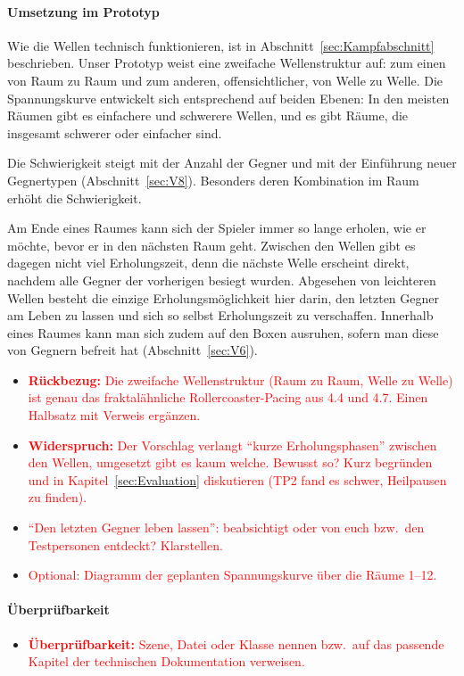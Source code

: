 \documentclass[../Main.tex]{subfiles}
\begin{document}
\paragraph{Umsetzung im Prototyp}
Wie die Wellen technisch funktionieren, ist in Abschnitt~\ref{sec:Kampfabschnitt} beschrieben. Unser Prototyp weist eine zweifache Wellenstruktur auf: zum einen von Raum zu Raum und zum anderen, offensichtlicher, von Welle zu Welle. Die Spannungskurve entwickelt sich entsprechend auf beiden Ebenen: In den meisten Räumen gibt es einfachere und schwerere Wellen, und es gibt Räume, die insgesamt schwerer oder einfacher sind.

Die Schwierigkeit steigt mit der Anzahl der Gegner und mit der Einführung neuer Gegnertypen (Abschnitt~\ref{sec:V8}). Besonders deren Kombination im Raum erhöht die Schwierigkeit.

Am Ende eines Raumes kann sich der Spieler immer so lange erholen, wie er möchte, bevor er in den nächsten Raum geht. Zwischen den Wellen gibt es dagegen nicht viel Erholungszeit, denn die nächste Welle erscheint direkt, nachdem alle Gegner der vorherigen besiegt wurden. Abgesehen von leichteren Wellen besteht die einzige Erholungsmöglichkeit hier darin, den letzten Gegner am Leben zu lassen und sich so selbst Erholungszeit zu verschaffen. Innerhalb eines Raumes kann man sich zudem auf den Boxen ausruhen, sofern man diese von Gegnern befreit hat (Abschnitt~\ref{sec:V6}).

\begin{itemize}[leftmargin=1.5cm]
    \item \textcolor{red}{\textbf{Rückbezug:} Die zweifache Wellenstruktur (Raum zu Raum, Welle zu Welle) ist genau das fraktalähnliche Rollercoaster-Pacing aus 4.4 und 4.7. Einen Halbsatz mit Verweis ergänzen.}
    \item \textcolor{red}{\textbf{Widerspruch:} Der Vorschlag verlangt \enquote{kurze Erholungsphasen} zwischen den Wellen, umgesetzt gibt es kaum welche. Bewusst so? Kurz begründen und in Kapitel~\ref{sec:Evaluation} diskutieren (TP2 fand es schwer, Heilpausen zu finden).}
    \item \textcolor{red}{\enquote{Den letzten Gegner leben lassen}: beabsichtigt oder von euch bzw.\ den Testpersonen entdeckt? Klarstellen.}
    \item \textcolor{red}{Optional: Diagramm der geplanten Spannungskurve über die Räume 1--12.}
\end{itemize}

\paragraph{Überprüfbarkeit}
\begin{itemize}[leftmargin=1.5cm]
    \item \textcolor{red}{\textbf{Überprüfbarkeit:} Szene, Datei oder Klasse nennen bzw.\ auf das passende Kapitel der technischen Dokumentation verweisen.}
\end{itemize}
\end{document}
